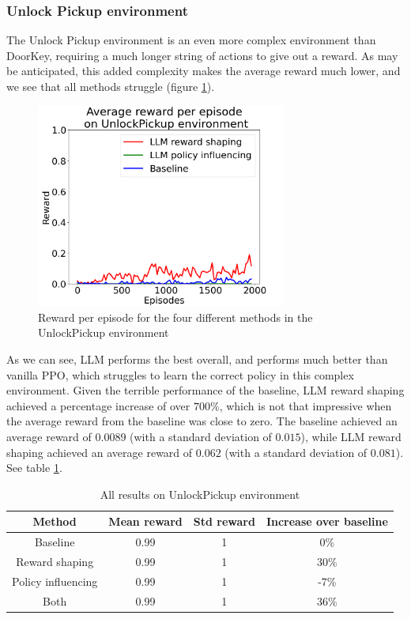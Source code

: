 \documentclass[conference]{IEEEtran}
\begin{document}
\subsubsection{Unlock Pickup environment}

The Unlock Pickup environment is an even more complex environment than DoorKey, requiring a much longer string of actions to give out a reward. As may be anticipated, this added complexity makes the average reward much lower, and we see that all methods struggle (figure \ref{unlockpickupresults}).

\begin{figure}[h]
\centerline{\includegraphics[width=3.25in]{figure/unlockpickupresults.png}}
\caption{Reward per episode for the four different methods in the UnlockPickup environment}
\label{unlockpickupresults}
\end{figure}

As we can see, LLM performs the best overall, and performs much better than vanilla PPO, which struggles to learn the correct policy in this complex environment. Given the terrible performance of the baseline, LLM reward shaping achieved a percentage increase of over $700\%$, which is not that impressive when the average reward from the baseline was close to zero. The baseline achieved an average reward of $0.0089$ (with a standard deviation of $0.015$), while LLM reward shaping achieved an average reward of $0.062$ (with a standard deviation of $0.081$). See table \ref{unlockpickuptable}.

\begin{table}[h]
\caption{All results on UnlockPickup environment}
\begin{center}
\label{unlockpickuptable}
\begin{tabular}{c | c c c}
Method & Mean reward & Std reward & Increase over baseline \\
\hline
Baseline & 0.99 & 1 & 0\% \\
Reward shaping & 0.99 & 1 & 30\% \\
Policy influencing & 0.99 & 1 & -7\% \\
Both & 0.99 & 1 & 36\% \\
\end{tabular}
\end{center}
\end{table}
\end{document}

